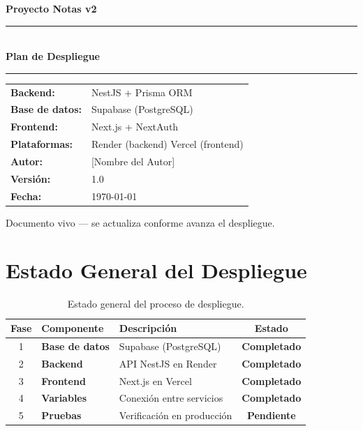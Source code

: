 \documentclass[12pt, a4paper]{article}
\newcommand{\ok}{\textcolor{completado}{\textbf{Completado}}}
\newcommand{\pend}{\textcolor{pendiente}{\textbf{Pendiente}}}
\begin{document}
\begin{titlepage}
    \centering
    \vspace*{2cm}

    {\LARGE \textbf{Proyecto Notas v2}}\\[0.5cm]
    \rule{\linewidth}{0.5pt}\\[0.8cm]
    {\Huge \textbf{Plan de Despliegue}}\\[0.8cm]
    \rule{\linewidth}{0.5pt}

    \vspace{1.5cm}

    \begin{tabular}{ll}
        \textbf{Backend:}        & NestJS + Prisma ORM \\[0.3cm]
        \textbf{Base de datos:}  & Supabase (PostgreSQL) \\[0.3cm]
        \textbf{Frontend:}       & Next.js + NextAuth \\[0.3cm]
        \textbf{Plataformas:}    & Render (backend) \quad Vercel (frontend) \\[0.3cm]
        \textbf{Autor:}          & [Nombre del Autor] \\[0.3cm]
        \textbf{Versión:}        & 1.0 \\[0.3cm]
        \textbf{Fecha:}          & \today \\[0.3cm]
    \end{tabular}

    \vfill
    {\small Documento vivo --- se actualiza conforme avanza el despliegue.}
\end{titlepage}

\newpage
\tableofcontents
\newpage

\section{Estado General del Despliegue}

\begin{table}[H]
    \centering
    \begin{tabular}{c >{\bfseries}p{4cm} p{6cm} c}
        \toprule
        \textbf{Fase} & \textbf{Componente} & \textbf{Descripción} & \textbf{Estado} \\
        \midrule
        1 & Base de datos & Supabase (PostgreSQL) & \ok \\
        2 & Backend       & API NestJS en Render  & \ok \\
        3 & Frontend      & Next.js en Vercel     & \ok \\
        4 & Variables     & Conexión entre servicios & \ok \\
        5 & Pruebas       & Verificación en producción & \pend \\
        \bottomrule
    \end{tabular}
    \caption{Estado general del proceso de despliegue.}
\end{table}
\end{document}
